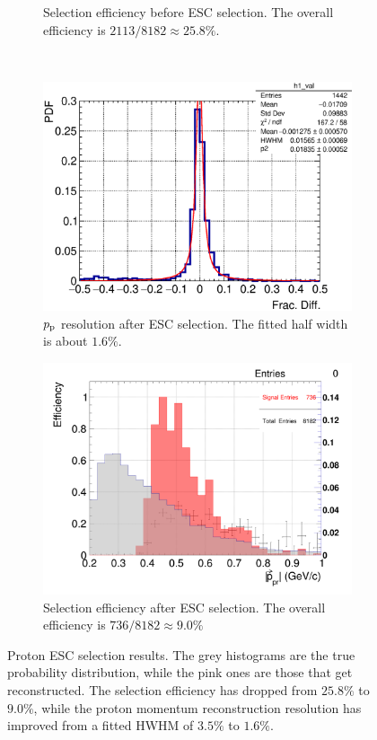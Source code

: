 \begin{figure}[t]
\begin{subfigure}{\dbfigwid\textwidth}
           \caption{Selection efficiency before ESC selection. The overall efficiency is $2113/8182\approx25.8\%$.}
           \label{subfig:ppr-eff-bfESC}
      \end{subfigure}
      \\
      \begin{subfigure}{\dbfigwid\textwidth}
           \includegraphics[width=\textwidth]{figures/sel/p_pr_res_pdf_al14_zoom.eps}
           \caption{$p_\textrm{p}$ resolution after ESC selection. The fitted half width is about $1.6\%$.}
           \label{subfig:ppr-res-afESC}
      \end{subfigure}
      \begin{subfigure}{\dbfigwid\textwidth}
           \includegraphics[width=\textwidth]{figures/sel/p_pr_eff_al14.png}
           \caption{Selection efficiency after ESC selection. The overall efficiency is $736/8182\approx9.0\%$}
           \label{subfig:ppr-eff-afESC}
      \end{subfigure}
      \caption{Proton ESC selection results. The grey histograms are the true probability distribution, while the pink ones are those that get reconstructed. The selection efficiency has dropped from $25.8\%$ to $9.0\%$, while the proton momentum reconstruction resolution has improved from a fitted HWHM of $3.5\%$ to $1.6\%$.}
      \label{fig:esc-ppr-reseff}
   \end{figure}


